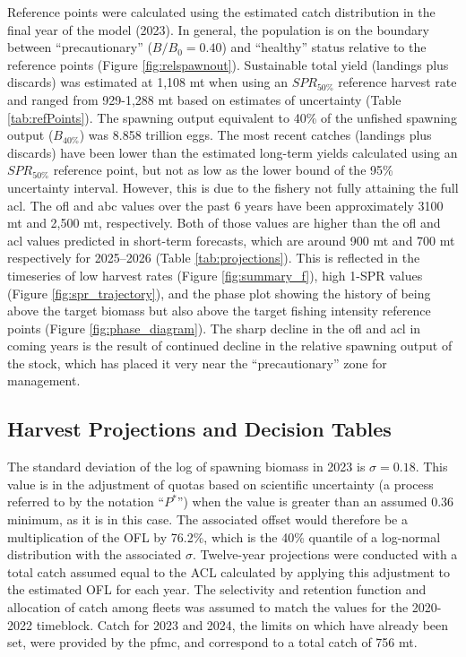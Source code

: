 \documentclass[11pt,
  english,
  letterpaper,
]{article}
\begin{document}
Reference points were calculated using the estimated catch distribution in the final year of the model (2023). In general, the population is on the boundary between ``precautionary'' (\(B/B_0 = 0.40\)) and ``healthy'' status relative to the reference points (Figure \ref{fig:relspawnout}). Sustainable total yield (landings plus discards) was estimated at 1,108 mt when using an \(SPR_{50\%}\) reference harvest rate and ranged from 929-1,288 mt based on estimates of uncertainty (Table \ref{tab:refPoints}). The spawning output equivalent to 40\% of the unfished spawning output (\(B_{40\%}\)) was 8.858 trillion eggs. The most recent catches (landings plus discards) have been lower than the estimated long-term yields calculated using an \(SPR_{50\%}\) reference point, but not as low as the lower bound of the 95\% uncertainty interval. However, this is due to the fishery not fully attaining the full \gls{acl}. The \gls{ofl} and \gls{abc} values over the past 6 years have been approximately 3100 mt and 2,500 mt, respectively. Both of those values are higher than the \gls{ofl} and \gls{acl} values predicted in short-term forecasts, which are around 900 mt and 700 mt respectively for 2025--2026 (Table \ref{tab:projections}). This is reflected in the timeseries of low harvest rates (Figure \ref{fig:summary_f}), high 1-SPR values (Figure \ref{fig:spr_trajectory}), and the phase plot showing the history of being above the target biomass but also above the target fishing intensity reference points (Figure \ref{fig:phase_diagram}). The sharp decline in the \gls{ofl} and \gls{acl} in coming years is the result of continued decline in the relative spawning output of the stock, which has placed it very near the ``precautionary'' zone for management.

\hypertarget{harvest-projections-and-decision-tables}{%
\subsection{Harvest Projections and Decision Tables}\label{harvest-projections-and-decision-tables}}

The standard deviation of the log of spawning biomass in 2023 is \(\sigma = 0.18\). This value is in the adjustment of quotas based on scientific uncertainty (a process referred to by the notation ``\(P^*\)'') when the value is greater than an assumed 0.36 minimum, as it is in this case. The associated offset would therefore be a multiplication of the OFL by 76.2\%, which is the 40\% quantile of a log-normal distribution with the associated \(\sigma\). Twelve-year projections were conducted with a total catch assumed equal to the ACL calculated by applying this adjustment to the estimated OFL for each year. The selectivity and retention function and allocation of catch among fleets was assumed to match the values for the 2020-2022 timeblock. Catch for 2023 and 2024, the limits on which have already been set, were provided by the \gls{pfmc}, and correspond to a total catch of 756 mt.
\end{document}
